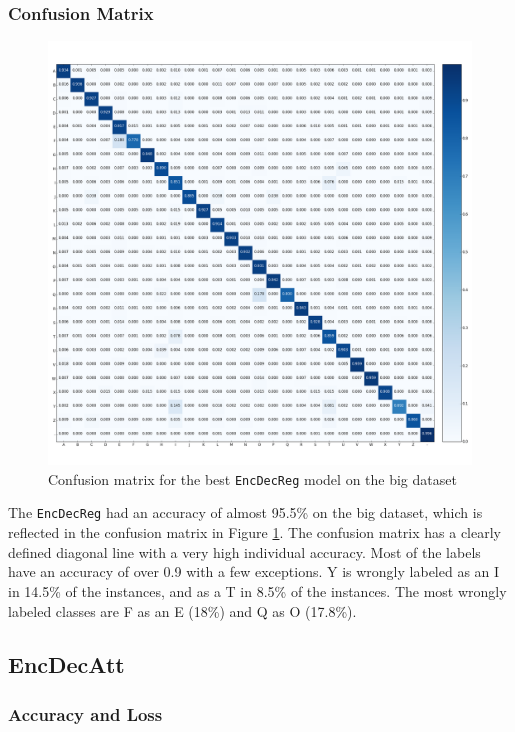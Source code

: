 \subsubsection{Confusion Matrix}
\begin{figure}[H]
    \centering
    \includegraphics[width=1\textwidth]{fig/results/experiment1/big/encdecreg/confusion_matrix.png}
    \caption{Confusion matrix for the best {\tt EncDecReg} model on the big dataset}
    \label{fig:result1_big_encdecreg_confusion_matrix}
\end{figure}

The {\tt EncDecReg} had an accuracy of almost 95.5\% on the big dataset, which is reflected in the confusion matrix in Figure \ref{fig:result1_big_encdecreg_confusion_matrix}. The confusion matrix has a clearly defined diagonal line with a very high individual accuracy. Most of the labels have an accuracy of over 0.9 with a few exceptions. Y is wrongly labeled as an I in 14.5\% of the instances, and as a T in 8.5\% of the instances. The most wrongly labeled classes are F as an E (18\%) and Q as O (17.8\%).

\subsection{EncDecAtt}
\subsubsection{Accuracy and Loss}

